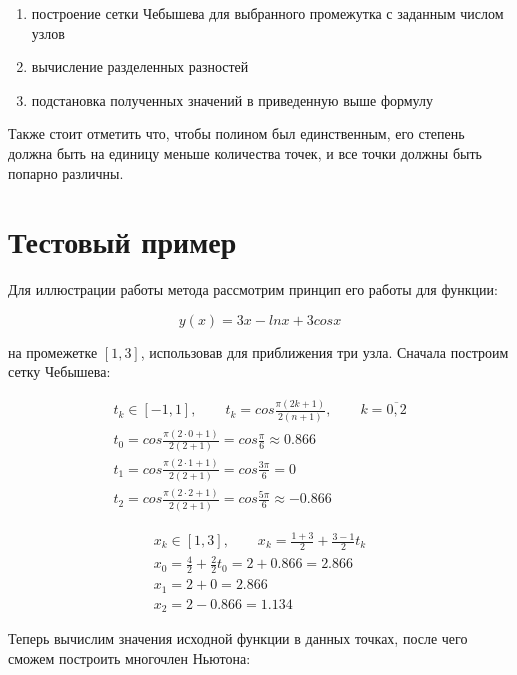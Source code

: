 \documentclass{article}
\begin{document}
\begin{enumerate}
    \item построение сетки Чебышева для выбранного промежутка с заданным числом узлов
    \item вычисление разделенных разностей
    \item подстановка полученных значений в приведенную выше формулу
\end{enumerate}

\bigskip

Также стоит отметить что, чтобы полином был единственным, его степень должна быть на
единицу меньше количества точек, и все точки должны быть попарно различны.

\section{Тестовый пример}

Для иллюстрации работы метода рассмотрим принцип его работы для функции:

\begin{equation}
y(x) = 3x - ln x + 3 cos x
\end{equation}

на промежетке $[1, 3]$, использовав для приближения три узла.
Сначала построим сетку Чебышева:

\begin{gather}
t_k \in [-1, 1], \qquad t_k = cos \frac{\pi (2k + 1)}{2(n+1)}, \qquad k = \overline{0, 2} \nonumber \\
t_0 = cos \frac{\pi (2 \cdot 0 + 1)}{2(2 + 1)} = cos \frac{\pi}{6} \approx 0.866 \nonumber \\
t_1 = cos \frac{\pi (2 \cdot 1 + 1)}{2(2 + 1)} = cos \frac{3\pi}{6} = 0 \nonumber \\
t_2 = cos \frac{\pi (2 \cdot 2 + 1)}{2(2 + 1)} = cos \frac{5\pi}{6} \approx -0.866
\end{gather}

\begin{gather}
x_k \in [1, 3], \qquad x_k = \frac{1 + 3}{2} + \frac{3 - 1}{2} t_k \nonumber \\
x_0 = \frac{4}{2} + \frac{2}{2} t_0 = 2 + 0.866 = 2.866 \nonumber \\
x_1 = 2 + 0 = 2.866 \nonumber \\
x_2 = 2 - 0.866 = 1.134
\end{gather}

Теперь вычислим значения исходной функции в данных точках, после чего сможем построить многочлен Ньютона:
\end{document}
